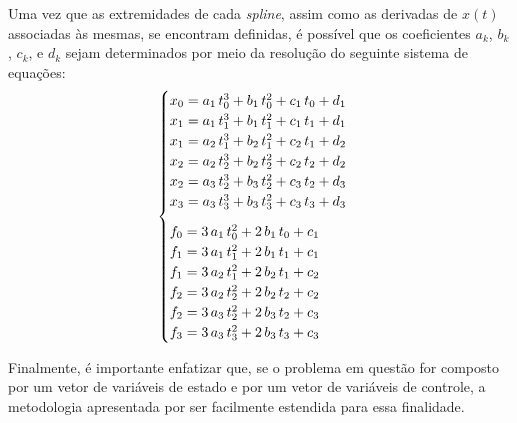Uma vez que as extremidades de cada \textit{spline}, assim como as derivadas de $ x(t) $ associadas às mesmas, se encontram definidas, é possível que os coeficientes $ a_k $, $ b_k $, $ c_k $, e $ d_k $ sejam determinados por meio da resolução do seguinte sistema de equações:
%
\begin{equation}
\label{eq:revisao:splinesCubicas}
\begin{cases}
x_0 = a_1 \, t_0^3 + b_1 \, t_0^2 + c_1 \, t_0 + d_1 \\
x_1 = a_1 \, t_1^3 + b_1 \, t_1^2 + c_1 \, t_1 + d_1 \\
x_1 = a_2 \, t_1^3 + b_2 \, t_1^2 + c_2 \, t_1 + d_2 \\
x_2 = a_2 \, t_2^3 + b_2 \, t_2^2 + c_2 \, t_2 + d_2 \\
x_2 = a_3 \, t_2^3 + b_3 \, t_2^2 + c_3 \, t_2 + d_3 \\
x_3 = a_3 \, t_3^3 + b_3 \, t_3^2 + c_3 \, t_3 + d_3 \vspace{0.25cm} \\ 
f_0 = 3 \, a_1 \, t_0^2 + 2 \, b_1 \, t_0 + c_1 \\
f_1 = 3 \, a_1 \, t_1^2 + 2 \, b_1 \, t_1 + c_1 \\
f_1 = 3 \, a_2 \, t_1^2 + 2 \, b_2 \, t_1 + c_2 \\
f_2 = 3 \, a_2 \, t_2^2 + 2 \, b_2 \, t_2 + c_2 \\
f_2 = 3 \, a_3 \, t_2^2 + 2 \, b_3 \, t_2 + c_3 \\
f_3 = 3 \, a_3 \, t_3^2 + 2 \, b_3 \, t_3 + c_3
\end{cases}
\end{equation}

Finalmente, é importante enfatizar que, se o problema em questão for composto por um vetor de variáveis de estado e por um vetor de variáveis de controle, a metodologia apresentada por ser facilmente estendida para essa finalidade.


